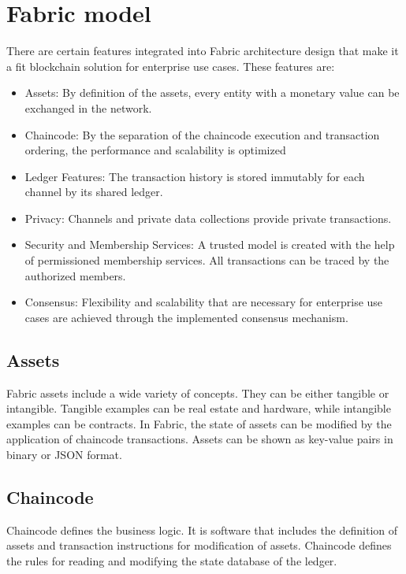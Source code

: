 \documentclass[sigconf,natbib=false]{acmart}
\begin{document}
    \section{Fabric model}
    There are certain features integrated into Fabric architecture design that make it a fit blockchain solution for enterprise use cases. These features are:\cite{FabricModel}
    \begin{itemize}
        \item Assets: By definition of the assets, every entity with a monetary value can be exchanged in the network.
        \item Chaincode: By the separation of the chaincode execution and transaction ordering, the performance and scalability is optimized
        \item Ledger Features: The transaction history is stored immutably for each channel by its shared ledger.
        \item Privacy: Channels and private data collections provide private transactions.
        \item Security and Membership Services: A trusted model is created with the help of permissioned membership services. All transactions can be traced by the authorized members.
        \item Consensus: Flexibility and scalability that are necessary for enterprise use cases are achieved through the implemented consensus mechanism.
    \end{itemize}
    \subsection{Assets}
    Fabric assets include a wide variety of concepts. They can be either tangible or intangible. Tangible examples can be real estate and hardware, while intangible examples can be contracts. In Fabric, the state of assets can be modified by the application of chaincode transactions. Assets can be shown as key-value pairs in binary or JSON format.\cite{FabricModel}
    \subsection{Chaincode}
    Chaincode defines the business logic. It is software that includes the definition of assets and transaction instructions for modification of assets. Chaincode defines the rules for reading and modifying the state database of the ledger.\cite{FabricModel}
\end{document}
